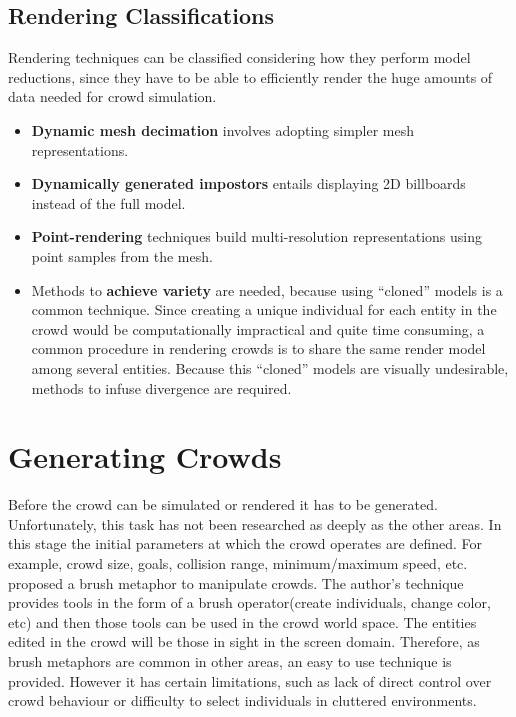 \documentclass[6pt]{article} %
\begin{document}
\begin{multicols}{2}
\subsection{Rendering Classifications}
\label{subsec:RenderingClassification}

Rendering techniques can be classified considering how they perform model reductions, since they have to be able to efficiently render the huge amounts of data needed for crowd simulation.\\

\begin{itemize}
\item \textbf{Dynamic mesh decimation} involves adopting simpler mesh representations.
\item \textbf{Dynamically generated impostors} entails displaying 2D billboards instead of the full model.
\item \textbf{Point-rendering} techniques build multi-resolution representations using point samples from the mesh.
\item Methods to \textbf{achieve variety} are needed, because using ``cloned'' models is a common technique. Since creating a unique individual for each entity in the crowd would be computationally impractical and quite time consuming, a common procedure in rendering crowds is to share the same render model among several entities.
Because this ``cloned'' models are visually undesirable, methods to infuse divergence are required.
\end{itemize}
  

\section{Generating Crowds}
\label{sec:CrowdGen}

Before the crowd can be simulated or rendered it has to be generated.
Unfortunately, this task has not been researched as deeply as the other areas.
In this stage the initial parameters at which the crowd operates are defined.
For example, crowd size, goals, collision range, minimum/maximum speed, etc.\\

\cite{Ulicny2004} proposed a brush metaphor to manipulate crowds.
The author's technique provides tools in the form of a brush operator(create individuals, change color, etc) and then those tools can be used in the crowd world space.
The entities edited in the crowd will be those in sight in the screen domain.
Therefore, as brush metaphors are common in other areas, an easy to use technique is provided.
However it has certain limitations, such as lack of direct control over crowd behaviour or difficulty to select individuals in cluttered environments.\\


\end{multicols}
\end{document}
